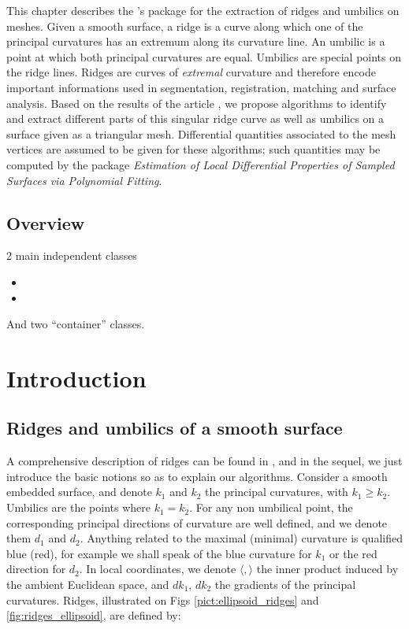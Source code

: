 
\newtheorem{definition}{Definition.}
\newcommand{\hot}{h.o.t}%


This chapter describes the \cgal's package for the extraction of
ridges and umbilics on meshes.  Given a smooth surface, a ridge is a
curve along which one of the principal curvatures has an extremum
along its curvature line. An umbilic is a point at which both
principal curvatures are equal. Umbilics are special points on the
ridge lines. Ridges are curves of {\em extremal} curvature and
therefore encode important informations used in segmentation,
registration, matching and surface analysis.  Based on the results of
the article
\cite{rr}, we propose algorithms to identify and extract
different parts of this singular ridge curve as well as umbilics on a
surface given as a triangular mesh. Differential quantities associated
to the mesh vertices are assumed to be given for these algorithms;
such quantities may be computed by the package {\em Estimation of
Local Differential Properties of Sampled Surfaces via Polynomial
Fitting}.


\subsection{Overview}

2 main independent classes

\begin{itemize}
\item
{}
\item
{}
\end{itemize}

And two ``container'' classes.

\section{Introduction}
\label{sec:intro}

\subsection{Ridges and umbilics of a smooth surface}

A comprehensive description of ridges can be found in
\cite{hgyg-ttdpf-99,ip-gd-01}, and in the sequel, we just
introduce the basic notions so as to explain our algorithms.
Consider a smooth embedded surface, and denote $k_1$ and $k_2$ the
principal curvatures, with $k_1\geq k_2$. Umbilics are the points
where $k_1=k_2$.  For any non umbilical point, the corresponding
principal directions of curvature are well defined, and we denote them
$d_1$ and $d_2$. 
Anything related to the maximal (minimal) curvature is qualified blue
(red), for example we shall speak of the blue curvature for $k_1$ or
the red direction for $d_2$.
In local coordinates, we denote $\langle , \rangle$
the inner product induced by the ambient Euclidean space, and $dk_1$,
$dk_2$ the gradients of the principal curvatures. Ridges, illustrated
on Figs \ref{pict:ellipsoid_ridges} and \ref{fig:ridges_ellipsoid},
are defined by:

